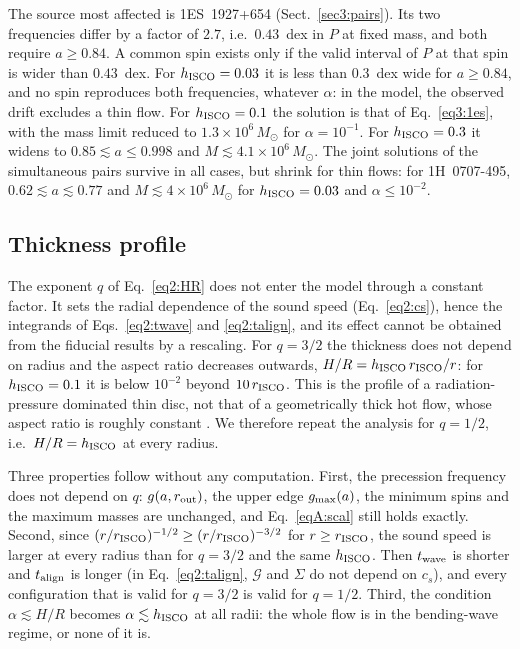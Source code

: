 The source most affected is 1ES~1927+654 (Sect.~\ref{sec3:pairs}).
Its two frequencies differ by a factor of $2.7$, i.e.\ $0.43$~dex in $P$ at fixed mass, and both require $a\geq0.84$.
A common spin exists only if the valid interval of $P$ at that spin is wider than $0.43$~dex.
For $h_\textup{ISCO}=0.03$ it is less than $0.3$~dex wide for $a\geq0.84$, and no spin reproduces both frequencies, whatever $\alpha$: in the model, the observed drift excludes a thin flow.
For $h_\textup{ISCO}=0.1$ the solution is that of Eq.~\eqref{eq3:1es}, with the mass limit reduced to $1.3\times10^6\,M_\odot$ for $\alpha=10^{-1}$.
For $h_\textup{ISCO}=0.3$ it widens to $0.85\lesssim a\leq0.998$ and $M\lesssim4.1\times10^6\,M_\odot$.
The joint solutions of the simultaneous pairs survive in all cases, but shrink for thin flows: for 1H~0707-495, $0.62\lesssim a\lesssim0.77$ and $M\lesssim4\times10^6\,M_\odot$ for $h_\textup{ISCO}=0.03$ and $\alpha\leq10^{-2}$.

\subsection{Thickness profile}
\label{appA:q}

The exponent $q$ of Eq.~\eqref{eq2:HR} does not enter the model through a constant factor.
It sets the radial dependence of the sound speed (Eq.~\ref{eq2:cs}), hence the integrands of Eqs.~\eqref{eq2:twave} and \eqref{eq2:talign}, and its effect cannot be obtained from the fiducial results by a rescaling.
For $q=3/2$ the thickness does not depend on radius and the aspect ratio decreases outwards, $H/R=h_\textup{ISCO}\,r_\textup{ISCO}/r$: for $h_\textup{ISCO}=0.1$ it is below $10^{-2}$ beyond $10\,r_\textup{ISCO}$.
This is the profile of a radiation-pressure dominated thin disc, not that of a geometrically thick hot flow, whose aspect ratio is roughly constant \citep[$H/R\simeq0.2$ in][]{PIF}.
We therefore repeat the analysis for $q=1/2$, i.e.\ $H/R=h_\textup{ISCO}$ at every radius.

Three properties follow without any computation.
First, the precession frequency does not depend on $q$: $g(a,r_\textup{out})$, the upper edge $g_\textup{max}(a)$, the minimum spins and the maximum masses are unchanged, and Eq.~\eqref{eqA:scal} still holds exactly.
Second, since $(r/r_\textup{ISCO})^{-1/2}\geq(r/r_\textup{ISCO})^{-3/2}$ for $r\geq r_\textup{ISCO}$, the sound speed is larger at every radius than for $q=3/2$ and the same $h_\textup{ISCO}$.
Then $t_\textup{wave}$ is shorter and $t_\textup{align}$ is longer (in Eq.~\ref{eq2:talign}, $\mathcal{G}$ and $\Sigma$ do not depend on $c_s$), and every configuration that is valid for $q=3/2$ is valid for $q=1/2$.
Third, the condition $\alpha\lesssim H/R$ becomes $\alpha\lesssim h_\textup{ISCO}$ at all radii: the whole flow is in the bending-wave regime, or none of it is.

